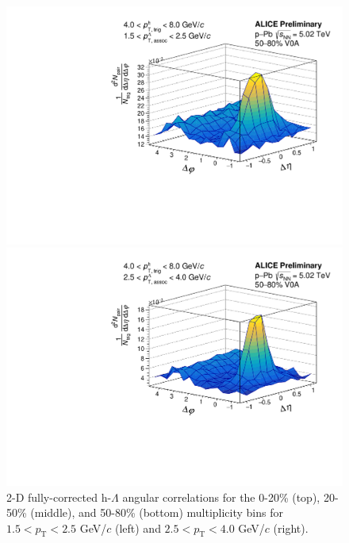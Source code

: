 \begin{figure}[ht]
\begin{minipage}{0.48\textwidth}
		\includegraphics[width=\textwidth]{figures/analysis/h_lambda_2d_mixcor_fancy_label_50_80_lowpt.pdf}
	\end{minipage}
	\begin{minipage}{0.48\textwidth}
		\includegraphics[width=\textwidth]{figures/analysis/h_lambda_2d_mixcor_fancy_label_50_80_highpt.pdf}
	\end{minipage}
	\caption{2-D fully-corrected h-$\Lambda$ angular correlations for the 0-20\% (top), 20-50\% (middle), and 50-80\% (bottom) multiplicity bins for $1.5 < p_{\text{T}} < 2.5$ GeV/$c$ (left) and $2.5 < p_{\text{T}} < 4.0$ GeV/$c$ (right).}
	\label{fig:h_lambda_2d_final}
\end{figure}
